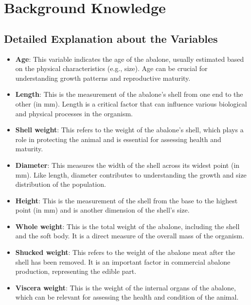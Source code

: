 \documentclass{article}
\begin{document}
\section{Background Knowledge}
\subsection{Detailed Explanation about the Variables}
\begin{itemize}
    \item \textbf{Age}: This variable indicates the age of the abalone, usually estimated based on the physical characteristics (e.g., size). Age can be crucial for understanding growth patterns and reproductive maturity.
    
    \item \textbf{Length}: This is the measurement of the abalone's shell from one end to the other (in mm). Length is a critical factor that can influence various biological and physical processes in the organism.

    \item \textbf{Shell weight}: This refers to the weight of the abalone's shell, which plays a role in protecting the animal and is essential for assessing health and maturity.

    \item \textbf{Diameter}: This measures the width of the shell across its widest point (in mm). Like length, diameter contributes to understanding the growth and size distribution of the population.

    \item \textbf{Height}: This is the measurement of the shell from the base to the highest point (in mm) and is another dimension of the shell’s size.

    \item \textbf{Whole weight}: This is the total weight of the abalone, including the shell and the soft body. It is a direct measure of the overall mass of the organism.

    \item \textbf{Shucked weight}: This refers to the weight of the abalone meat after the shell has been removed. It is an important factor in commercial abalone production, representing the edible part.

    \item \textbf{Viscera weight}: This is the weight of the internal organs of the abalone, which can be relevant for assessing the health and condition of the animal.
\end{itemize}
\end{document}
